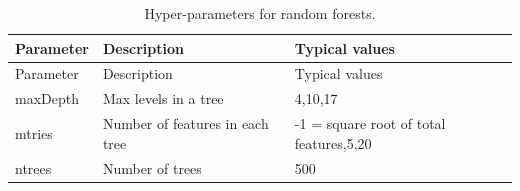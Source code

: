 \documentclass[10.5pt]{book}
\theoremstyle{definition}
\theoremstyle{definition}
\theoremstyle{definition}
\theoremstyle{remark}
\begin{document}
\begin{longtable}[]{@{}lll@{}}
\caption{\label{tab:randomForestParameters} Hyper-parameters for random
forests.}\tabularnewline
\toprule
\begin{minipage}[b]{0.13\columnwidth}\raggedright\strut
Parameter\strut
\end{minipage} & \begin{minipage}[b]{0.16\columnwidth}\raggedright\strut
Description\strut
\end{minipage} & \begin{minipage}[b]{0.20\columnwidth}\raggedright\strut
Typical values\strut
\end{minipage}\tabularnewline
\midrule
\endfirsthead
\toprule
\begin{minipage}[b]{0.13\columnwidth}\raggedright\strut
Parameter\strut
\end{minipage} & \begin{minipage}[b]{0.16\columnwidth}\raggedright\strut
Description\strut
\end{minipage} & \begin{minipage}[b]{0.20\columnwidth}\raggedright\strut
Typical values\strut
\end{minipage}\tabularnewline
\midrule
\endhead
\begin{minipage}[t]{0.13\columnwidth}\raggedright\strut
maxDepth\strut
\end{minipage} & \begin{minipage}[t]{0.16\columnwidth}\raggedright\strut
Max levels in a tree\strut
\end{minipage} & \begin{minipage}[t]{0.20\columnwidth}\raggedright\strut
4,10,17\strut
\end{minipage}\tabularnewline
\begin{minipage}[t]{0.13\columnwidth}\raggedright\strut
mtries\strut
\end{minipage} & \begin{minipage}[t]{0.16\columnwidth}\raggedright\strut
Number of features in each tree\strut
\end{minipage} & \begin{minipage}[t]{0.20\columnwidth}\raggedright\strut
-1 = square root of total features,5,20\strut
\end{minipage}\tabularnewline
\begin{minipage}[t]{0.13\columnwidth}\raggedright\strut
ntrees\strut
\end{minipage} & \begin{minipage}[t]{0.16\columnwidth}\raggedright\strut
Number of trees\strut
\end{minipage} & \begin{minipage}[t]{0.20\columnwidth}\raggedright\strut
500\strut
\end{minipage}\tabularnewline
\bottomrule
\end{longtable}
\end{document}
